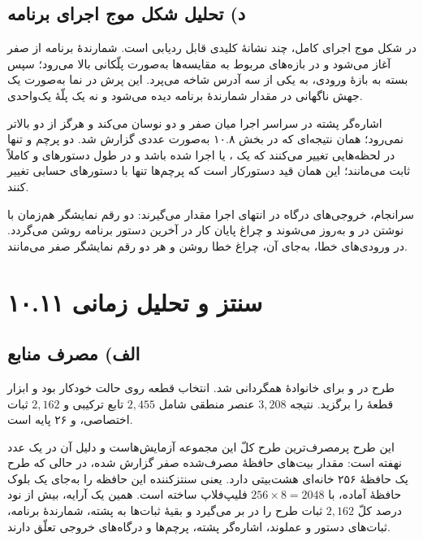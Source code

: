 \documentclass[12pt,a4paper]{article}
\begin{document}

	\subsection*{د) تحلیل شکل موج اجرای برنامه}
	در شکل موج اجرای کامل، چند نشانهٔ کلیدی قابل ردیابی است. شمارندهٔ برنامه از صفر آغاز می‌شود و در بازه‌های مربوط به مقایسه‌ها به‌صورت پلّکانی بالا می‌رود؛ سپس بسته به بازهٔ ورودی، به یکی از سه آدرس شاخه می‌پرد. این پرش در نما به‌صورت یک جهش ناگهانی در مقدار شمارندهٔ برنامه دیده می‌شود و نه یک پلّهٔ یک‌واحدی.

	اشاره‌گر پشته در سراسر اجرا میان صفر و دو نوسان می‌کند و هرگز از دو بالاتر نمی‌رود؛ همان نتیجه‌ای که در بخش ۱۰.۸ به‌صورت عددی گزارش شد. دو پرچم  و  تنها در لحظه‌هایی تغییر می‌کنند که یک ،  یا  اجرا شده باشد و در طول دستورهای  و  کاملاً ثابت می‌مانند؛ این همان قید دستورکار است که پرچم‌ها تنها با دستورهای حسابی تغییر کنند.

	سرانجام، خروجی‌های درگاه در انتهای اجرا مقدار می‌گیرند: دو رقم نمایشگر هم‌زمان با نوشتن در  و  به‌روز می‌شوند و چراغ پایان کار در آخرین دستور برنامه روشن می‌گردد. در ورودی‌های خطا، به‌جای آن، چراغ خطا روشن و هر دو رقم نمایشگر صفر می‌مانند.


	\section*{۱۰.۱۱ سنتز و تحلیل زمانی}
	\subsection*{الف) مصرف منابع}
	طرح در  و برای خانوادهٔ  همگردانی شد. انتخاب قطعه روی حالت خودکار بود و ابزار قطعهٔ  را برگزید. نتیجه \(3{,}208\) عنصر منطقی شامل \(2{,}455\) تابع ترکیبی و \(2{,}162\) ثبات اختصاصی، و ۲۶ پایه است.


	این طرح پرمصرف‌ترین طرح کلّ این مجموعه آزمایش‌هاست و دلیل آن در یک عدد نهفته است: مقدار بیت‌های حافظهٔ مصرف‌شده صفر گزارش شده، در حالی که طرح یک حافظهٔ ۲۵۶ خانه‌ای هشت‌بیتی دارد. یعنی سنتز‌کننده این حافظه را به‌جای یک بلوک حافظهٔ آماده، با \(256\times8=2048\) فلیپ‌فلاپ ساخته است. همین یک آرایه، بیش از نود درصد کلّ \(2{,}162\) ثبات طرح را در بر می‌گیرد و بقیهٔ ثبات‌ها به پشته، شمارندهٔ برنامه، ثبات‌های دستور و عملوند، اشاره‌گر پشته، پرچم‌ها و درگاه‌های خروجی تعلّق دارند.
\end{document}
